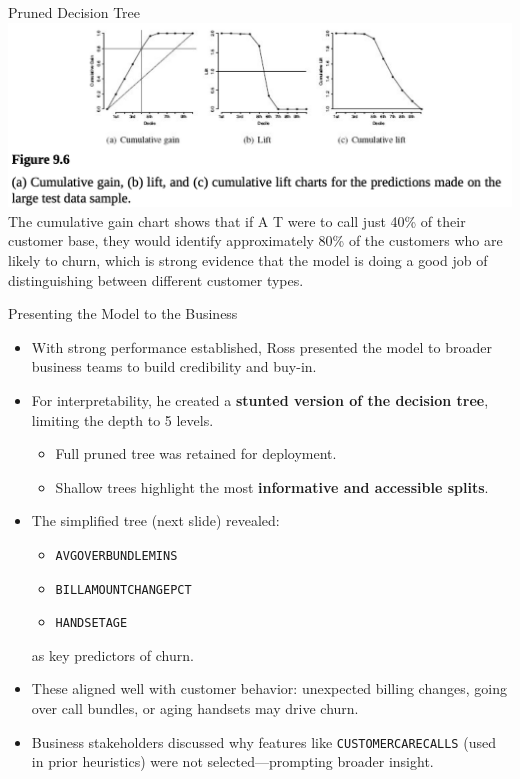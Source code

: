 \documentclass[aspectratio=169,xcolor=dvipsnames]{beamer}
\begin{document}
\begin{frame}{Pruned Decision Tree}
\centering
\includegraphics[scale=0.4]{images/eval_fig.png} \\

The cumulative gain chart shows that if A T were
to call just 40\% of their customer base, they would identify approximately 80\% of the
customers who are likely to churn, which is strong evidence that the model is doing a good
job of distinguishing between different customer types.
\end{frame}

\begin{frame}{Presenting the Model to the Business}

\begin{itemize}
  \item With strong performance established, Ross presented the model to broader business teams to build credibility and buy-in.
  \item For interpretability, he created a \textbf{stunted version of the decision tree}, limiting the depth to 5 levels.
  \begin{itemize}
    \item Full pruned tree was retained for deployment.
    \item Shallow trees highlight the most \textbf{informative and accessible splits}.
  \end{itemize}
  \item The simplified tree (next slide) revealed:
  \begin{itemize}
    \item \texttt{AVGOVERBUNDLEMINS}
    \item \texttt{BILLAMOUNTCHANGEPCT}
    \item \texttt{HANDSETAGE}
  \end{itemize}
  as key predictors of churn.
  \item These aligned well with customer behavior: unexpected billing changes, going over call bundles, or aging handsets may drive churn.
  \item Business stakeholders discussed why features like \texttt{CUSTOMERCARECALLS} (used in prior heuristics) were not selected—prompting broader insight.
\end{itemize}
\end{frame}
\end{document}
